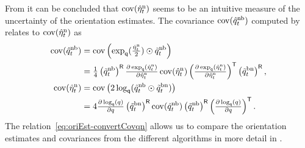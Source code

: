 From  it can be concluded that $\operatorname{cov} ( \hat{\eta}_t^\text{n})$ seems to be an intuitive measure of the uncertainty of the orientation estimates. The covariance $\operatorname{cov} (\hat{q}_t^\text{nb})$ computed by  relates to $\operatorname{cov} ( \hat{\eta}_t^\text{n})$ as
\begin{subequations}
\label{eq:oriEst-convertCovqn}
\begin{align}
\operatorname{cov} (\hat{q}_t^\text{nb}) &= \operatorname{cov} \left(\exp_\mathsf{q} (\tfrac{\hat{\eta}_t^\text{n}}{2} ) \odot \tilde{q}_t^\text{nb} \right) \nonumber \\
&= \tfrac{1}{4} \left( \tilde{q}_t^\text{nb} \right)^{\mathsf{R}} \tfrac{\partial \exp_\mathsf{q}(\hat{\eta}_t^\text{n})}{\partial \hat{\eta}_t^\text{n}} \operatorname{cov} (\hat{\eta}_t^\text{n}) \left( \tfrac{\partial \exp_\mathsf{q}(\hat{\eta}_t^\text{n})}{\partial \hat{\eta}_t^\text{n}} \right)^{\mathsf{T}} \left( \tilde{q}_t^\text{bn} \right)^{\mathsf{R}}, \\
\operatorname{cov} (\hat{\eta}_t^\text{n}) &= \operatorname{cov} \left( 2 \log_\mathsf{q} ( \hat{q}_t^\text{nb} \odot \tilde{q}_t^\text{bn}  ) \right) \nonumber \\
&= 4 \tfrac{\partial \log_\mathsf{q} (q)}{\partial q} \left( \tilde{q}_t^\text{bn} \right)^{\mathsf{R}} \operatorname{cov} ( \hat{q}_t^\text{nb} ) \left( \tilde{q}_t^\text{nb} \right)^{\mathsf{R}} \left( \tfrac{\partial \log_\mathsf{q} (q)}{\partial q} \right)^{\mathsf{T}}.
\end{align}
\end{subequations}
The relation~\eqref{eq:oriEst-convertCovqn} allows us to compare the orientation estimates and covariances from the different algorithms in more detail in . 

